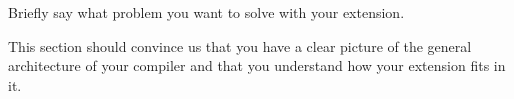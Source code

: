 Briefly say what problem you want to solve with your extension.

This section should convince us that you have a clear picture of the
general architecture of your compiler and that you understand how your
extension fits in it.
